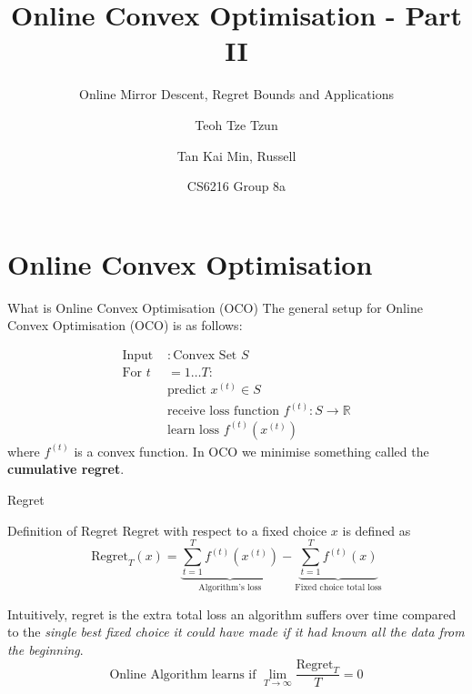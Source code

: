 \documentclass{beamer}
\title[Online Mirror Descent, Regret Bounds and Applications] %
{Online Convex Optimisation - Part II}
\subtitle{Online Mirror Descent, Regret Bounds and Applications}
\author[CS6216 Group 8a] %
{Teoh Tze Tzun\inst{1} \and Tan Kai Min, Russell\inst{1}}
\institute[VFU] %
{
  \inst{1}%
  School of Computing\\
  National University of Singapore
}
\date[VLC 2021] %
{CS6216 Group 8a}
\begin{document}
\frame{\titlepage}
\section{Online Convex Optimisation}
\begin{frame}{What is Online Convex Optimisation (OCO)}
The general setup for Online Convex Optimisation (OCO) is as follows:

\begin{align*}
    \text{Input }&: \text{Convex Set }S\\
    \text{For }t&=1\ldots T:\\
                &\text{predict } x^{(t)} \in S\\
                &\text{receive loss function }f^{(t)}: S \to \mathbb R\\
                &\text{learn loss }f^{(t)}(x^{(t)})
    \end{align*}
    where $f^{(t)}$ is a convex function.
In OCO we minimise something called the \textbf{cumulative regret}.
\end{frame}

\begin{frame}{Regret}
\begin{block}{Definition of Regret}
Regret with respect to a fixed choice $x$ is defined as
    \begin{equation}
    \text{Regret}_T(x) = \underbrace{\sum_{t=1}^T f^{(t)}(x^{(t)})}_{\text{Algorithm's loss}} - \underbrace{\sum_{t=1}^Tf^{(t)}(x)}_{\text{Fixed choice total loss}}
\end{equation}
\end{block}
Intuitively, regret is the extra total loss an algorithm suffers over time compared to the \textit{single best fixed choice it could have made if it had known all the data from the beginning}.
\begin{equation*}
    \text{Online Algorithm learns if }\lim_{T \to \infty} \frac{\text{Regret}_T}{T} = 0
\end{equation*}
\end{frame}
\end{document}
